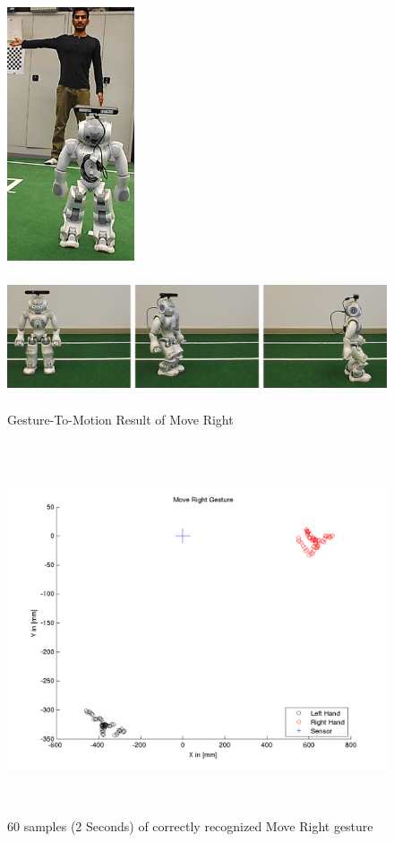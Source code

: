 \begin{figure}
	[h] 
	\begin{minipage}
		{1 
		\textwidth} \centering 
		\includegraphics[height=75mm]{figures/result/usr-move-right.png} \caption*{} 
	\end{minipage}
	\begin{minipage}
		{1 
		\textwidth} 
		\includegraphics[height=42mm]{figures/result/nao-gm-move-right.png} 
	\end{minipage}
	\caption{Gesture-To-Motion Result of Move Right} \label{res:gm:move:right} 
\end{figure}
\begin{figure}
	[h] \centering 
	\includegraphics[height=110mm]{figures/result/test-move-right.png} \caption{60 samples (2 Seconds) of correctly recognized Move Right gesture}
	\label{res:pl:move:right}  
\end{figure}
